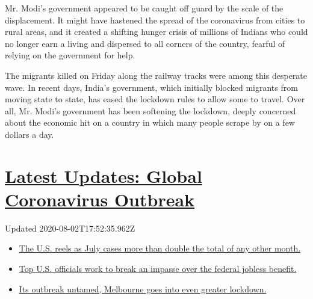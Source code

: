 Mr. Modi's government appeared to be caught off guard by the scale of
the displacement. It might have hastened the spread of the coronavirus
from cities to rural areas, and it created a shifting hunger crisis of
millions of Indians who could no longer earn a living and dispersed to
all corners of the country, fearful of relying on the government for
help.

The migrants killed on Friday along the railway tracks were among this
desperate wave. In recent days, India's government, which initially
blocked migrants from moving state to state, has eased the lockdown
rules to allow some to travel. Over all, Mr. Modi's government has been
softening the lockdown, deeply concerned about the economic hit on a
country in which many people scrape by on a few dollars a day.

\hypertarget{latest-updates-global-coronavirus-outbreak}{%
\section{\texorpdfstring{\href{https://www.nytimes.com/2020/08/01/world/coronavirus-covid-19.html?action=click\&pgtype=Article\&state=default\&region=MAIN_CONTENT_1\&context=storylines_live_updates}{Latest
Updates: Global Coronavirus
Outbreak}}{Latest Updates: Global Coronavirus Outbreak}}\label{latest-updates-global-coronavirus-outbreak}}

Updated 2020-08-02T17:52:35.962Z

\begin{itemize}
\tightlist
\item
  \href{https://www.nytimes.com/2020/08/01/world/coronavirus-covid-19.html?action=click\&pgtype=Article\&state=default\&region=MAIN_CONTENT_1\&context=storylines_live_updates\#link-34047410}{The
  U.S. reels as July cases more than double the total of any other
  month.}
\item
  \href{https://www.nytimes.com/2020/08/01/world/coronavirus-covid-19.html?action=click\&pgtype=Article\&state=default\&region=MAIN_CONTENT_1\&context=storylines_live_updates\#link-780ec966}{Top
  U.S. officials work to break an impasse over the federal jobless
  benefit.}
\item
  \href{https://www.nytimes.com/2020/08/01/world/coronavirus-covid-19.html?action=click\&pgtype=Article\&state=default\&region=MAIN_CONTENT_1\&context=storylines_live_updates\#link-2bc8948}{Its
  outbreak untamed, Melbourne goes into even greater lockdown.}
\end{itemize}

